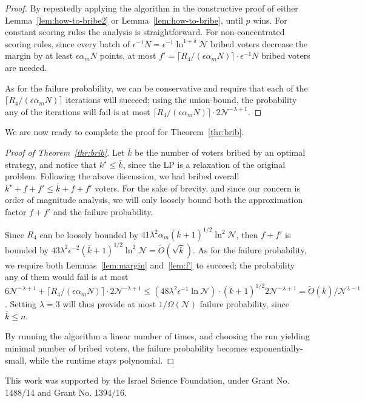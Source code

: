\documentclass[letterpaper]{article} %
\newtheorem{corollary}[theorem]{Corollary}
\theoremstyle{definition}
\newcommand{\NN}{\mathcal{N}}
\newcommand\vecgreek{\bm}
\newcommand{\veca}{\vecgreek{\alpha}}
\newcommand{\Ra}{\mathcal{R}_{\veca}}
\begin{document}
\begin{proof}
	By repeatedly applying the algorithm in the constructive proof of either  Lemma~\ref{lem:how-to-bribe2} or Lemma~\ref{lem:how-to-bribe}, until $p$ wins. For constant scoring rules the analysis is straightforward. For non-concentrated scoring rules, since every batch of $\epsilon^{-1}N=\epsilon^{-1}\ln^{1+\delta}\NN$ bribed voters decrease the margin by at least $\epsilon \alpha_m N$ points, at most $f'=\lceil R_4/(\epsilon \alpha_m N)\rceil \cdot  \epsilon^{-1}N$ bribed voters are needed.

	As for the failure probability, we can be conservative and require that each of the $\lceil R_4/(\epsilon \alpha_m N)\rceil $ iterations will succeed; using the union-bound, the probability any of the iterations will fail is at most $\lceil R_4/(\epsilon \alpha_m N)\rceil \cdot 2\NN^{-\lambda+1}$.
\end{proof}
We are now ready to complete the proof for Theorem~\ref{thr:brib}.
\begin{proof}[Proof of Theorem~\ref{thr:brib}]
	Let $\bar{k}$ be the number of voters bribed by an optimal strategy, and notice that $k^\star \leq \bar{k}$, since the LP is a relaxation of the original problem.
	Following  the above discussion, we had bribed overall $k^\star +f+f' \leq \bar{k} +f+f'$ voters. For the sake of brevity, and since our concern is order of magnitude analysis, we will only loosely bound both the approximation factor $f+f'$ and the failure probability.

	Since $R_4$ can be loosely bounded by $41\lambda^2 \alpha_m  (\bar{k}+1)^{1/2}\ln^2 \NN $, then
	$f+f'$ is bounded by $43\lambda^2 \epsilon^{-2} (\bar{k}+1)^{1/2} \ln^2 \NN = \widetilde{O}(\sqrt{\bar{k}})$. As for the failure probability, we require both Lemmas~\ref{lem:margin} and~\ref{lem:f'} to succeed; the probability any of them would fail is at most $6\NN^{-\lambda+1}+\lceil R_4/(\epsilon \alpha_m N)\rceil \cdot 2\NN^{-\lambda+1} \leq (48\lambda^2 \epsilon^{-1} \ln \NN) \cdot (\bar{k}+1)^{1/2}  2\NN^{-\lambda+1}=\widetilde{O}(\bar{k})/\NN^{\lambda-1}$. Setting $\lambda=3$ will thus provide at most $1/\Omega(\NN)$ failure probability, since $\bar{k} \leq n$.

	By running the algorithm a linear number of times, and choosing the run yielding minimal number of bribed voters, the failure probability becomes exponentially-small, while the runtime stays polynomial.
\end{proof}






	This work was supported by the Israel Science Foundation, under Grant No. 1488/14 and Grant No. 1394/16.





\clearpage

\end{document}
